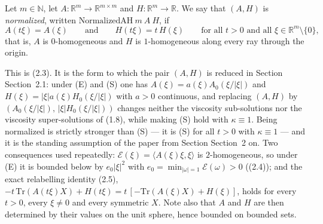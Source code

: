 \begin{definition}
Let $m\in\mathbb N$, let $A:\mathbb R^m\to\mathbb R^{m\times m}$ and
$H:\mathbb R^m\to\mathbb R$. We say that $(A,H)$ is \emph{normalized}, written
$\mathrm{NormalizedAH}\ m\ A\ H$, if
\[
 A(t\xi)=A(\xi)\qquad\text{and}\qquad H(t\xi)=t\,H(\xi)
 \qquad\text{for all }t>0\text{ and all }\xi\in\mathbb R^m\setminus\{0\} ,
\]
that is, $A$ is $0$-homogeneous and $H$ is $1$-homogeneous along every ray through the
origin.

This is (2.3). It is the form to which the pair $(A,H)$ is reduced in Section
Section~2.1: under (E) and (S) one has $A(\xi)=a(\xi)A_0(\xi/|\xi|)$ and
$H(\xi)=|\xi|a(\xi)H_0(\xi/|\xi|)$ with $a>0$ continuous, and replacing $(A,H)$ by
$(A_0(\xi/|\xi|),\,|\xi|H_0(\xi/|\xi|))$ changes neither the viscosity sub-solutions nor
the viscosity super-solutions of (1.8), while making (S) hold with $\kappa\equiv1$.
Being normalized is strictly stronger than (S) --- it is (S) for all $t>0$ with
$\kappa\equiv1$ --- and it is the standing assumption of the paper from Section
Section~2 on. Two consequences used repeatedly: $\mathcal E(\xi)=\langle
A(\xi)\xi,\xi\rangle$ is $2$-homogeneous, so under (E) it is bounded below by
$e_0|\xi|^2$ with $e_0=\min_{|\omega|=1}\mathcal E(\omega)>0$ ((2.4)); and the exact
relabelling identity (2.5),
$-t\,\mathrm{Tr}(A(t\xi)X)+H(t\xi)=t\,[-\mathrm{Tr}(A(\xi)X)+H(\xi)]$, holds for every
$t>0$, every $\xi\neq0$ and every symmetric $X$. Note also that $A$ and $H$ are then
determined by their values on the unit sphere, hence bounded on bounded sets.
\end{definition}
